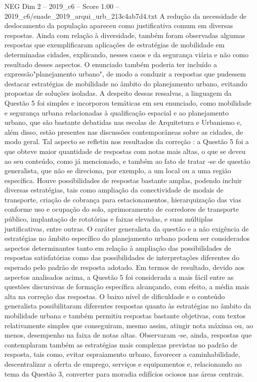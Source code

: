\begin{textsample}{NEG Dim 2 – 2019\_c6 – Score 1.00 – 2019\_c6/enade\_2019\_arqui\_urb\_213c4ab7d4.txt}
A redução da necessidade de deslocamento da população apareceu como justificativa comum em diversas respostas.
Ainda com relação à diversidade, também foram observadas algumas respostas que exemplificaram aplicações de estratégias de mobilidade em determinadas cidades, explicando, nesses casos e da segurança viária e não como resultado desses aspectos.
O enunciado também poderia ter incluído a expressão"planejamento urbano", de modo a conduzir a respostas que pudessem destacar estratégias de mobilidade no âmbito do planejamento urbano, evitando propostas de soluções isoladas.
A despeito dessas ressalvas, a linguagem da Questão 5 foi simples e incorporou temáticas em seu enunciado, como mobilidade e segurança urbana relacionadas à qualificação espacial e ao planejamento urbano, que são bastante debatidas nas escolas de Arquitetura e Urbanismo e, além disso, estão presentes nas discussões contemporâneas sobre as cidades, de modo geral.
Tal aspecto se refletiu nos resultados da correção : a Questão 5 foi a que obteve maior quantidade de respostas com notas mais altas, o que se deveu ao seu conteúdo, como já mencionado, e também ao fato de tratar -se de questão generalista, que não se direciona, por exemplo, a um local ou a uma região específica.
Houve possibilidades de respostas bastante amplas, podendo incluir diversas estratégias, tais como ampliação da conectividade de modais de transporte, criação de cobrança para estacionamentos, hierarquização das vias conforme uso e ocupação do solo, aprimoramento de corredores de transporte público, implantação de rotatórias e faixas elevadas, e suas múltiplas justificativas, entre outras.
O caráter generalista da questão e a não exigência de estratégias no âmbito específico do planejamento urbano podem ser considerados aspectos determinantes tanto em relação à ampliação das possibilidades de respostas satisfatórias como das possibilidades de interpretações diferentes do esperado pelo padrão de resposta adotado.
Em termos de resultado, devido aos aspectos analisados acima, a Questão 5 foi considerada a mais fácil entre as questões discursivas de formação específica alcançando, com efeito, a média mais alta na correção das respostas.
O baixo nível de dificuldade e o conteúdo generalista possibilitaram diferentes respostas quanto às estratégias no âmbito da mobilidade urbana e também permitiu respostas bastante objetivas, com textos relativamente simples que conseguiram, mesmo assim, atingir nota máxima ou, ao menos, desempenho na faixa de notas altas.
Observaram -se, ainda, respostas que contemplaram também as estratégias mais complexas previstas no padrão de resposta, tais como, evitar espraiamento urbano, favorecer a caminhabilidade, descentralizar a oferta de emprego, serviços e equipamentos e, relacionando ao tema da Questão 3, converter para moradia edifícios ociosos nas áreas centrais.

\end{textsample}
